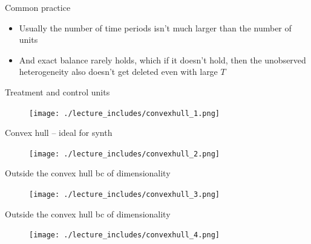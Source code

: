 \documentclass{beamer}
\begin{document}
\begin{frame}{Common practice}

\begin{itemize}
\item Usually the number of time periods isn't much larger than the number of units
\item And exact balance rarely holds, which if it doesn't hold, then the unobserved heterogeneity also doesn't get deleted even with large $T$
\end{itemize}

\end{frame}


\begin{frame}{Treatment and control units}

	\begin{figure}
	\texttt{[image: ./lecture\_includes/convexhull\_1.png]}
	\end{figure}

\end{frame}

\begin{frame}{Convex hull -- ideal for synth}

	\begin{figure}
	\texttt{[image: ./lecture\_includes/convexhull\_2.png]}
	\end{figure}

\end{frame}

\begin{frame}{Outside the convex hull bc of dimensionality}

	\begin{figure}
	\texttt{[image: ./lecture\_includes/convexhull\_3.png]}
	\end{figure}

\end{frame}

\begin{frame}{Outside the convex hull bc of dimensionality}

	\begin{figure}
	\texttt{[image: ./lecture\_includes/convexhull\_4.png]}
	\end{figure}

\end{frame}
\end{document}
